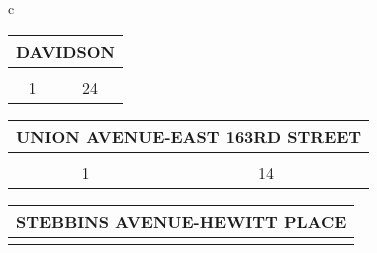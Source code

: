\begin{table}[H]
        \small
        \begin{tabular}{c}
                            
                        \begin{tabular}{cc}
                        \multicolumn{2}{l}{DAVIDSON}                                                                                                                                   \\ \hline
                        \rowcolor{\ccorange} 
                        \multicolumn{1}{|c|}{\cellcolor{\ccorange}{\color[HTML]{FFFFFF} Building}} & \multicolumn{1}{c|}{\cellcolor{\ccorange}{\color[HTML]{FFFFFF} Total Repairs}} \\ \hline
                        \multicolumn{1}{|c|}{1}                                                        & \multicolumn{1}{c|}{24}                                                             \\ \hline
\end{tabular}
                        \begin{tabular}{cc}
                        \multicolumn{2}{l}{UNION AVENUE-EAST 163RD STREET}                                                                                                                                   \\ \hline
                        \rowcolor{\ccorange} 
                        \multicolumn{1}{|c|}{\cellcolor{\ccorange}{\color[HTML]{FFFFFF} Building}} & \multicolumn{1}{c|}{\cellcolor{\ccorange}{\color[HTML]{FFFFFF} Total Repairs}} \\ \hline
                        \multicolumn{1}{|c|}{1}                                                        & \multicolumn{1}{c|}{14}                                                             \\ \hline
\end{tabular}
                        \begin{tabular}{cc}
                        \multicolumn{2}{l}{STEBBINS AVENUE-HEWITT PLACE}                                                                                                                                   \\ \hline
                        \rowcolor{\ccorange} 
                        \multicolumn{1}{|c|}{\cellcolor{\ccorange}{\color[HTML]{FFFFFF} Building}} & \multicolumn{1}{c|}{\cellcolor{\ccorange}{\color[HTML]{FFFFFF} Total Repairs}} \\ \hline

\end{tabular}
\end{tabular}
\end{table}

